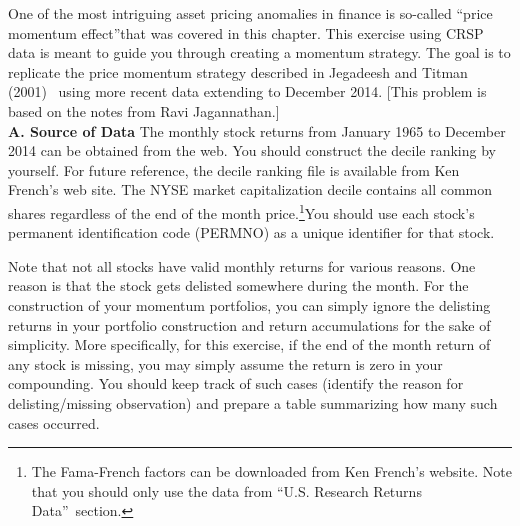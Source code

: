 \prob One of the most intriguing asset pricing anomalies in finance is so-called \textquotedblleft price momentum effect\textquotedblright that was covered in this chapter. This exercise using CRSP data is meant to guide you through creating a momentum strategy. The goal is to replicate the price momentum strategy described in Jegadeesh and Titman (2001)~\cite{JeTi} using more recent data extending to December 2014. [This problem is based on the notes from Ravi Jagannathan.] \\

\textbf{A. Source of Data}
The monthly stock returns from January 1965 to December 2014 can be obtained from the web. You should construct the decile ranking by yourself. For future reference, the decile ranking file is available from Ken French's web site. The NYSE market capitalization decile contains all common shares regardless of the end of the month price.\footnote{The Fama-French factors can be downloaded from Ken French's website. Note that you should only use the data from \textquotedblleft U.S. Research Returns Data\textquotedblright\ section.}You should use each stock's permanent identification code (PERMNO) as a unique identifier for that stock.

Note that not all stocks have valid monthly returns for various reasons. One reason is that the stock gets delisted somewhere during the month. For the construction of your momentum portfolios, you can simply ignore the delisting returns in your portfolio construction and return accumulations for the sake of simplicity. More specifically, for this exercise, if the end of the month return of any stock is missing, you may simply assume the return is zero in your compounding. You should keep track of such cases (identify the reason for delisting/missing observation) and prepare a table summarizing how many such cases occurred. \\

